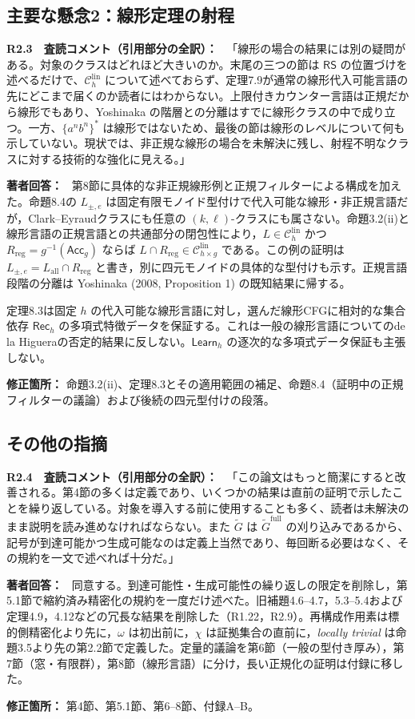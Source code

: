 \documentclass[10pt,a4paper]{ltjsarticle}
\newcommand{\Comment}[1]{\par\medskip\noindent\textbf{#1　査読コメント（引用部分の全訳）：}\ }
\newcommand{\Reply}{\par\noindent\textbf{著者回答：}\ }
\newcommand{\Location}[1]{\par\noindent\textbf{修正箇所：} #1\par}
\newcommand{\Chlin}{\mathcal C_h^{\mathrm{lin}}}
\newcommand{\Bh}{\mathsf{Rec}_h}
\newcommand{\Ah}{\mathsf{Learn}_h}
\newcommand{\RS}{\mathsf{RS}}
\begin{document}
\subsection*{主要な懸念2：線形定理の射程}
\Comment{R2.3}
「線形の場合の結果には別の疑問がある。対象のクラスはどれほど大きいのか。末尾の三つの節は $\RS$ の位置づけを述べるだけで、$\mathcal C_h^{\mathrm{lin}}$ について述べておらず、定理7.9が通常の線形代入可能言語の先にどこまで届くのか読者にはわからない。上限付きカウンター言語は正規だから線形でもあり、Yoshinaka の階層との分離はすでに線形クラスの中で成り立つ。一方、$\{a^nb^n\}^*$ は線形ではないため、最後の節は線形のレベルについて何も示していない。現状では、非正規な線形の場合を未解決に残し、射程不明なクラスに対する技術的な強化に見える。」

\Reply
第8節に具体的な非正規線形例と正規フィルターによる構成を加えた。命題8.4の $L_{\pm,e}$ は固定有限モノイド型付けで代入可能な線形・非正規言語だが，Clark--Eyraudクラスにも任意の $(k,\ell)$-クラスにも属さない。命題3.2(ii)と線形言語の正規言語との共通部分の閉包性により，$L\in\Chlin$ かつ $R_{\mathrm{reg}}=g^{-1}(\mathsf{Acc}_g)$ ならば $L\cap R_{\mathrm{reg}}\in\mathcal C_{h\times g}^{\mathrm{lin}}$ である。この例の証明は $L_{\pm,e}=L_{\mathrm{all}}\cap R_{\mathrm{reg}}$ と書き，別に四元モノイドの具体的な型付けも示す。正規言語段階の分離は Yoshinaka (2008, Proposition 1) の既知結果に帰する。

定理8.3は固定 $h$ の代入可能な線形言語に対し，選んだ線形CFGに相対的な集合依存 $\Bh$ の多項式特徴データを保証する。これは一般の線形言語についてのde la Higueraの否定的結果に反しない。$\Ah$ の逐次的な多項式データ保証も主張しない。
\Location{命題3.2(ii)、定理8.3とその適用範囲の補足、命題8.4（証明中の正規フィルターの議論）および後続の四元型付けの段落。}

\subsection*{その他の指摘}
\Comment{R2.4}
「この論文はもっと簡潔にすると改善される。第4節の多くは定義であり、いくつかの結果は直前の証明で示したことを繰り返している。対象を導入する前に使用することも多く、読者は未解決のまま説明を読み進めなければならない。また $\widetilde G$ は $\widetilde G^{\mathrm{full}}$ の刈り込みであるから、記号が到達可能かつ生成可能なのは定義上当然であり、毎回断る必要はなく、その規約を一文で述べれば十分だ。」

\Reply
同意する。到達可能性・生成可能性の繰り返しの限定を削除し，第5.1節で縮約済み精密化の規約を一度だけ述べた。旧補題4.6--4.7，5.3--5.4および定理4.9，4.12などの冗長な結果を削除した（R1.22，R2.9）。再構成作用素は標的側精密化より先に，$\omega$ は初出前に，$\chi$ は証拠集合の直前に，\emph{locally trivial} は命題3.5より先の第2.2節で定義した。定量的議論を第6節（一般の型付き厚み），第7節（窓・有限群），第8節（線形言語）に分け，長い正規化の証明は付録に移した。
\Location{第4節、第5.1節、第6--8節、付録A--B。}
\end{document}
